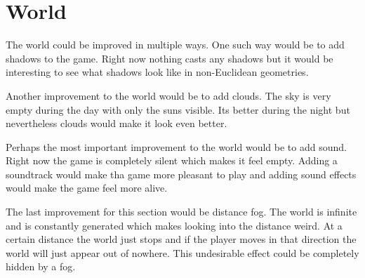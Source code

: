 \section{World}
The world could be improved in multiple ways.
One such way would be to add shadows to the game.
Right now nothing casts any shadows but it would be interesting to see what shadows look like in non-Euclidean geometries.

Another improvement to the world would be to add clouds.
The sky is very empty during the day with only the suns visible.
Its better during the night but nevertheless clouds would make it look even better.

Perhaps the most important improvement to the world would be to add sound.
Right now the game is completely silent which makes it feel empty.
Adding a soundtrack would make tha game more pleasant to play and adding sound effects would make the game feel more alive.

The last improvement for this section would be distance fog.
The world is infinite and is constantly generated which makes looking into the distance weird.
At a certain distance the world just stops and if the player moves in that direction the world will just appear out of nowhere.
This undesirable effect could be completely hidden by a fog.